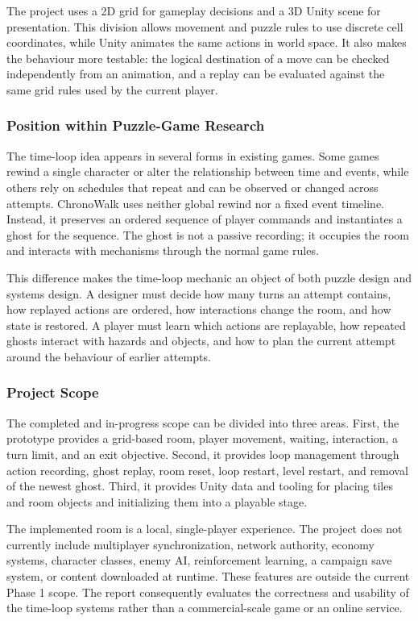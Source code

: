 The project uses a 2D grid for gameplay decisions and a 3D Unity scene for presentation. This division allows movement and puzzle rules to use discrete cell coordinates, while Unity animates the same actions in world space. It also makes the behaviour more testable: the logical destination of a move can be checked independently from an animation, and a replay can be evaluated against the same grid rules used by the current player.

\subsubsection{Position within Puzzle-Game Research}

The time-loop idea appears in several forms in existing games. Some games rewind a single character or alter the relationship between time and events, while others rely on schedules that repeat and can be observed or changed across attempts. ChronoWalk uses neither global rewind nor a fixed event timeline. Instead, it preserves an ordered sequence of player commands and instantiates a ghost for the sequence. The ghost is not a passive recording; it occupies the room and interacts with mechanisms through the normal game rules.

This difference makes the time-loop mechanic an object of both puzzle design and systems design. A designer must decide how many turns an attempt contains, how replayed actions are ordered, how interactions change the room, and how state is restored. A player must learn which actions are replayable, how repeated ghosts interact with hazards and objects, and how to plan the current attempt around the behaviour of earlier attempts.

\subsubsection{Project Scope}

The completed and in-progress scope can be divided into three areas. First, the prototype provides a grid-based room, player movement, waiting, interaction, a turn limit, and an exit objective. Second, it provides loop management through action recording, ghost replay, room reset, loop restart, level restart, and removal of the newest ghost. Third, it provides Unity data and tooling for placing tiles and room objects and initializing them into a playable stage.

The implemented room is a local, single-player experience. The project does not currently include multiplayer synchronization, network authority, economy systems, character classes, enemy AI, reinforcement learning, a campaign save system, or content downloaded at runtime. These features are outside the current Phase 1 scope. The report consequently evaluates the correctness and usability of the time-loop systems rather than a commercial-scale game or an online service.

